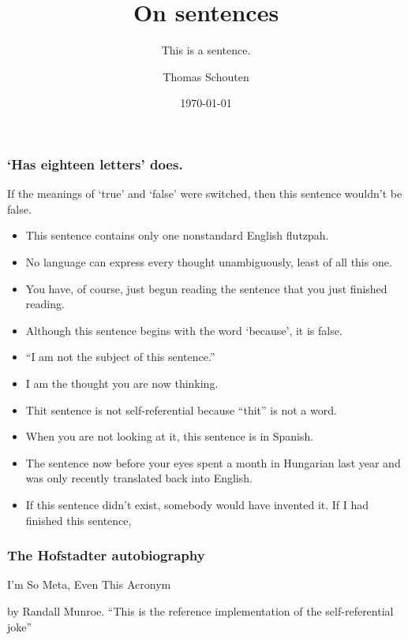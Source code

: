 \documentclass{beamer}
\title{On sentences}
\subtitle{This is a sentence.}
\author{Thomas Schouten}
\date{\today}
\begin{document}
    \frame{\titlepage}


%

    \begin{framefont}{\small}
        \begin{frame}
            \frametitle{`Has eighteen letters' does.}
            If the meanings of `true' and `false' were switched, then this sentence wouldn't be false.
            \begin{itemize}
                \item This sentence contains only one nonstandard English flutzpah.
                \item No language can express every thought unambiguously, least of all this one.
                \item You have, of course, just begun reading the sentence that you just finished reading.
                \item Although this sentence begins with the word `because', it is false.
                \item ``I am not the subject of this sentence.''
                \item I am the thought you are now thinking.
                \item Thit sentence is not self-referential because ``thit'' is not a word.
                \item When you are not looking at it, this sentence is in Spanish.
                \item The sentence now before your eyes spent a month in Hungarian last year and was only recently translated back into English.
                \item If this sentence didn't exist, somebody would have invented it.
                If I had finished this sentence,
            \end{itemize}
        \end{frame}
    \end{framefont}

    \begin{framefont}{\large}
        \begin{frame}
            \frametitle{The Hofstadter autobiography }

            I'm So Meta, Even This Acronym


            {\tiny by Randall Munroe.
             ``This is the reference implementation of the self-referential joke''}
        \end{frame}
    \end{framefont}
\end{document}
